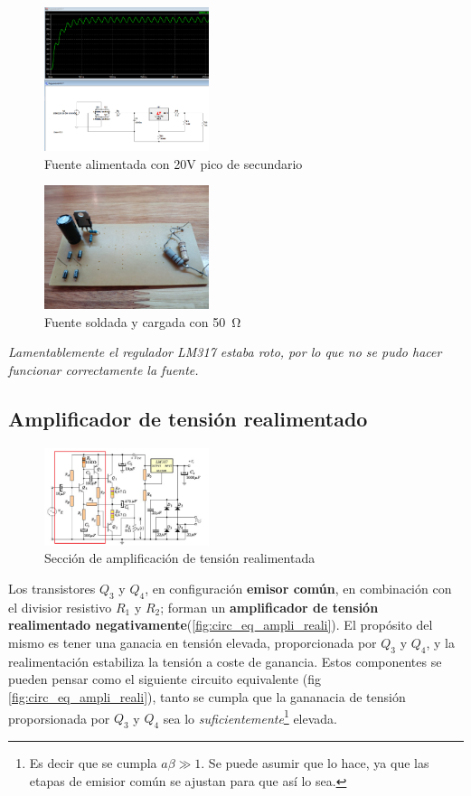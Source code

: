 \documentclass[letterpaper, 10 pt, conference]{ieeeconf}  %
\begin{document}
\begin{figure}[H]
  \centering
  \includegraphics[width=0.43\textwidth]{./imagenes/sim_fuente_mal.png}
  \caption{Fuente alimentada con 20V pico de secundario}
\end{figure}

\begin{figure}[H]
  \centering
  \includegraphics[width=0.43\textwidth]{./imagenes/fuente_cargada.jpeg}
  \caption{Fuente soldada y cargada con \qty{50}{\ohm}}
\end{figure}

\textit{Lamentablemente el regulador LM317 estaba roto, por lo que no se pudo hacer funcionar correctamente la fuente.}

\subsection{Amplificador de tensión realimentado}
\begin{figure}[H]
  \centering
  \includegraphics[width=0.43\textwidth]{./imagenes/placa_ampli_realimentado.png}
  \caption{Sección de amplificación de tensión realimentada}
  \label{fig:ampl_tension_reali}
\end{figure}
Los transistores $Q_3$ y $Q_4$, en configuración \textbf{emisor común}, en combinación con el divisior resistivo $R_1$ y $R_2$; forman un \textbf{amplificador de tensión realimentado negativamente}(\ref{fig:circ_eq_ampli_reali}). El propósito del mismo es tener una ganacia en tensión elevada, proporcionada por $Q_3$ y $Q_4$, y la realimentación estabiliza la tensión a coste de ganancia. Estos componentes se pueden pensar como el siguiente circuito equivalente (fig \ref{fig:circ_eq_ampli_reali}), tanto se cumpla que la gananacia de tensión proporsionada por $Q_3$ y $Q_4$ sea lo \textit{suficientemente}\footnote{Es decir que se cumpla $a\beta \gg 1$. Se puede asumir que lo hace, ya que las etapas de emisior común se ajustan para que así lo sea.} elevada.
\end{document}
